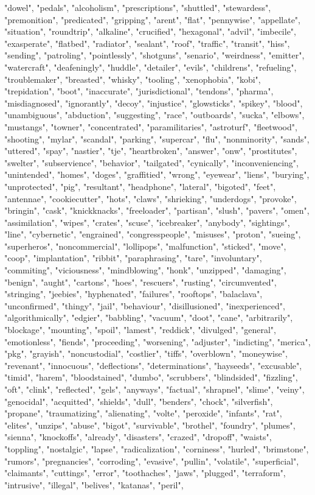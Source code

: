 "dowel", "pedals", "alcoholism", "prescriptions", "shuttled", "stewardess", "premonition", "predicated", "gripping", "arent", "flat", "pennywise", "appellate", "situation", "roundtrip", "alkaline", "crucified", "hexagonal", "advil", "imbecile", "exasperate", "flatbed", "radiator", "sealant", "roof", "traffic", "transit", "hiss", "sending", "patroling", "pointlessly", "shotguns", "senario", "weirdness", "emitter", "watercraft", "deafeningly", "huddle", "detailer", "evils", "childrens", "refueling", "troublemaker", "breasted", "whisky", "tooling", "xenophobia", "kobi", "trepidation", "boot", "inaccurate", "jurisdictional", "tendons", "pharma", "misdiagnosed", "ignorantly", "decoy", "injustice", "glowsticks", "spikey", "blood", "unambiguous", "abduction", "suggesting", "race", "outboards", "sucka", "elbows", "mustangs", "towner", "concentrated", "paramilitaries", "astroturf", "fleetwood", "shooting", "mylar", "scandal", "parking", "supercar", "flu", "nonminority", "sands", "uttered", "spay", "nastier", "tje", "heartbroken", "answer", "onw", "prostitutes", "swelter", "subservience", "behavior", "tailgated", "cynically", "inconveniencing", "unintended", "homes", "doges", "graffitied", "wrong", "eyewear", "liens", "burying", "unprotected", "pig", "resultant", "headphone", "lateral", "bigoted", "feet", "antennae", "cookiecutter", "hots", "claws", "shrieking", "underdogs", "provoke", "bringin", "cask", "knickknacks", "freeloader", "partisan", "slush", "pavers", "omen", "assimilation", "wipes", "crates", "scuse", "icebreaker", "anybody", "sightings", "line", "cybernetic", "engrained", "congresspeople", "misuses", "proton", "sueing", "superheros", "noncommercial", "lollipops", "malfunction", "sticked", "move", "coop", "implantation", "ribbit", "paraphrasing", "tare", "involuntary", "commiting", "viciousness", "mindblowing", "honk", "unzipped", "damaging", "benign", "aught", "cartons", "hoes", "rescuers", "rusting", "circumvented", "stringing", "jeebies", "hyphenated", "failures", "rooftops", "balaclava", "unconfirmed", "thingy", "jail", "behaviour", "disillusioned", "inexperienced", "algorithmically", "edgier", "babbling", "vacuum", "doot", "cane", "arbitrarily", "blockage", "mounting", "spoil", "lamest", "reddick", "divulged", "general", "emotionless", "fiends", "proceeding", "worsening", "adjuster", "indicting", "merica", "pkg", "grayish", "noncustodial", "costlier", "tiffs", "overblown", "moneywise", "revenant", "innocuous", "deflections", "determinations", "hayseeds", "excusable", "timid", "harem", "bloodstained", "dumbo", "scrubbers", "blindsided", "fizzling", "oft", "clink", "reflected", "gels", "anyways", "factual", "shrapnel", "slime", "veiny", "genocidal", "acquitted", "shields", "dull", "benders", "chock", "silverfish", "propane", "traumatizing", "alienating", "volte", "peroxide", "infants", "rat", "elites", "unzips", "abuse", "bigot", "survivable", "brothel", "foundry", "plumes", "sienna", "knockoffs", "already", "disasters", "crazed", "dropoff", "waists", "toppling", "nostalgic", "lapse", "radicalization", "corniness", "hurled", "brimstone", "rumors", "pregnancies", "corroding", "evasive", "pullin", "volatile", "superficial", "claimants", "cuttings", "error", "toothaches", "jaws", "plugged", "terraform", "intrusive", "illegal", "belives", "katanas", "peril", 